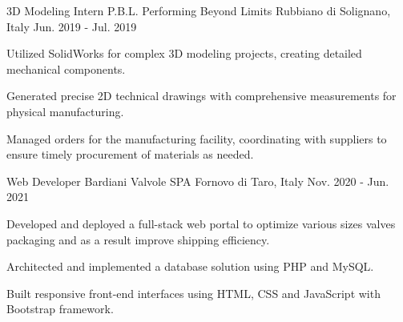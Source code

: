 \begin{cventries}
{\begin{cvitems}
    \end{cvitems}
  }
\cventry
  {3D Modeling Intern} %
  {P.B.L. Performing Beyond Limits} %
  {Rubbiano di Solignano, Italy} %
  {Jun. 2019 - Jul. 2019} %
  {
    \begin{cvitems} %
      \item {Utilized SolidWorks for complex 3D modeling projects, creating detailed mechanical components.}
      \item {Generated precise 2D technical drawings with comprehensive measurements for physical manufacturing.}
      \item {Managed orders for the manufacturing facility, coordinating with suppliers to ensure timely procurement of materials as needed.}
    \end{cvitems}
  }
\cventry
  {Web Developer} %
  {Bardiani Valvole SPA} %
  {Fornovo di Taro, Italy} %
  {Nov. 2020 - Jun. 2021} %
  {
    \begin{cvitems} %
      \item {Developed and deployed a full-stack web portal to optimize various sizes valves packaging and as a result improve shipping efficiency.}
      \item {Architected and implemented a database solution using PHP and MySQL.}
      \item {Built responsive front-end interfaces using HTML, CSS and JavaScript with Bootstrap framework.}
    \end{cvitems}
  }


\end{cventries}
